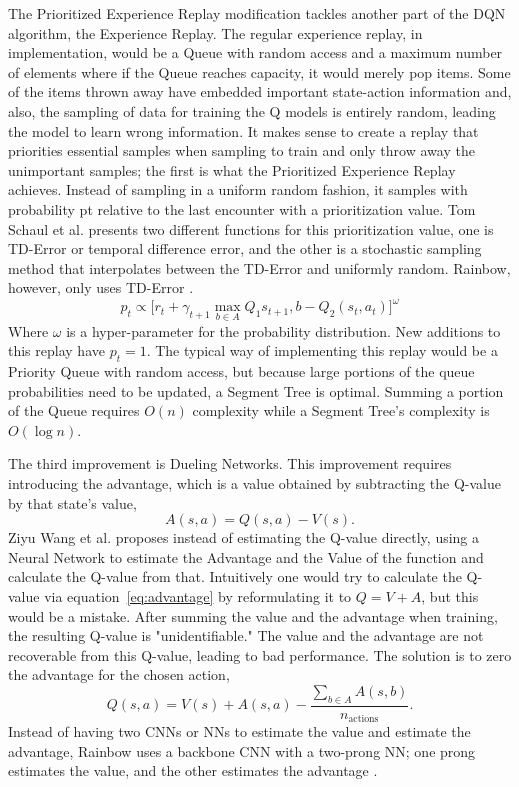 The Prioritized Experience Replay modification tackles another part of the DQN algorithm, the Experience Replay. The regular experience replay, in implementation, would be a Queue with random access and a maximum number of elements where if the Queue reaches capacity, it would merely pop items. Some of the items thrown away have embedded important state-action information and, also, the sampling of data for training the Q models is entirely random, leading the model to learn wrong information. It makes sense to create a replay that priorities essential samples when sampling to train and only throw away the unimportant samples; the first is what the Prioritized Experience Replay achieves. Instead of sampling in a uniform random fashion, it samples with probability pt relative to the last encounter with a prioritization value. Tom Schaul et al. presents two different functions for this prioritization value, one is TD-Error or temporal difference error, and the other is a stochastic sampling method that interpolates between the TD-Error and uniformly random. Rainbow, however, only uses TD-Error \cite{schaul_quan_antonoglou_silver_2016}. $$p_t\propto \big[r_t+\gamma_{t+1}\max_{b\in A}Q_1{s_{t+1}, b}-Q_2(s_t, a_t) \big]^\omega$$ Where $\omega$ is a hyper-parameter for the probability distribution. New additions to this replay have $p_t=1$. 
The typical way of implementing this replay would be a Priority Queue with random access, but because large portions of the queue probabilities need to be updated, a Segment Tree is optimal. Summing a portion of the Queue requires $O(n)$ complexity while a Segment Tree's complexity is $O(\log n)$.


The third improvement is Dueling Networks. This improvement requires introducing the advantage, which is a value obtained by subtracting the Q-value by that state's value, 
\begin{equation}\label{eq:advantage}
	A(s,a)=Q(s,a)-V(s).
\end{equation}
 Ziyu Wang et al. proposes instead of estimating the Q-value directly, using a Neural Network to estimate the Advantage and the Value of the function and calculate the Q-value from that. Intuitively one would try to calculate the Q-value via equation~\ref{eq:advantage} by reformulating it to $Q=V+A$, but this would be a mistake. After summing the value and the advantage when training, the resulting Q-value is "unidentifiable." The value and the advantage are not recoverable from this Q-value, leading to bad performance. The solution is to zero the advantage for the chosen action, $$Q(s, a)=V(s)+A(s, a)-\frac{\sum_{b\in A} A(s, b)}{n_{\text{actions}}}.$$ Instead of having two CNNs or NNs to estimate the value and estimate the advantage, Rainbow uses a backbone CNN with a two-prong NN; one prong estimates the value, and the other estimates the advantage \cite{wang_frietas_lanctot_2015}.
 
